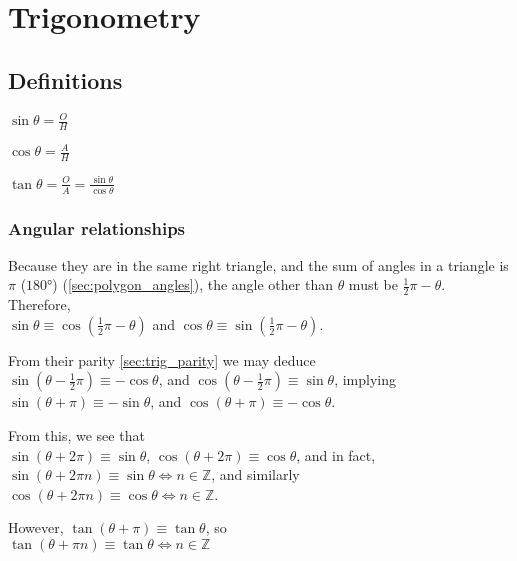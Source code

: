\documentclass[a4paper,11pt]{article}
\begin{document}
    \section{Trigonometry}

    \subsection{Definitions} \label{sec:trig_definitions}


    $\displaystyle\sin \theta = \frac OH$

    $\displaystyle\cos \theta = \frac AH$

    $\displaystyle\tan \theta = \frac OA = \frac{\sin \theta}{\cos \theta}$

    \subsubsection{Angular relationships} \label{sec:trig_periodic}


    Because they are in the same right triangle, and the sum of angles in a
    triangle is $\pi$ ($\ang{180}$) (\ref{sec:polygon_angles}), the angle other
    than $\theta$ must be $\frac 12 \pi - \theta$. Therefore,
    \\$\sin \theta \equiv \cos(\frac 12 \pi - \theta)$ and
    $\cos \theta \equiv \sin(\frac 12 \pi - \theta)$.

    From their parity \ref{sec:trig_parity} we may deduce
    \\$\sin(\theta - \frac 12 \pi) \equiv -\cos \theta$, and
    $\cos(\theta - \frac 12 \pi) \equiv \sin \theta$, implying
    \\$\sin(\theta + \pi) \equiv -\sin \theta$, and
    $\cos(\theta + \pi) \equiv -\cos \theta$.

    From this, we see that
    \\$\sin(\theta + 2\pi) \equiv \sin \theta$,
    $\cos(\theta + 2\pi) \equiv \cos \theta$, and in fact,
    \\$\sin(\theta + 2\pi n) \equiv \sin \theta \iff n \in \mathbb{Z}$,
    and similarly
    \\$\cos(\theta + 2\pi n) \equiv \cos \theta \iff n \in \mathbb{Z}$.

    However, $\tan(\theta + \pi) \equiv \tan \theta$, so
    \\$\tan(\theta + \pi n) \equiv \tan \theta \iff n \in \mathbb{Z}$
\end{document}
